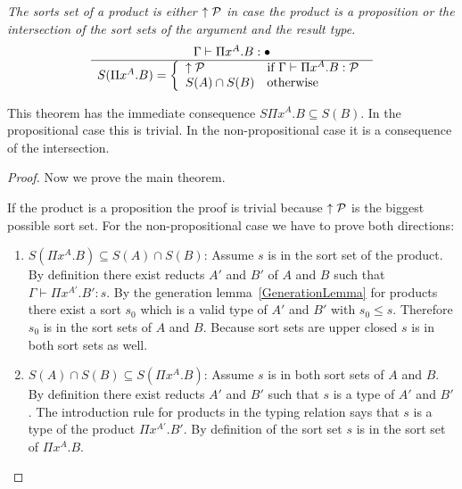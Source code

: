 \begin{theorem}
    \label{thm:SortSetProduct}
    \emph{The sorts set of a product is either ${\uparrow {\cal P}}$ in case the product
    is a proposition or the intersection of the sort sets of the argument and
    the result type.}
    $$
    \ruleh{
        \Gamma \vdash \Pi x^A. B : \dontcare
    }
    {
        S(\Pi x^A. B) =
        \dcases{
            \upper\Prop & \text{if }\Gamma \vdash \Pi x^A . B : \Prop
            \\
            S(A) \cap S(B) & \text{otherwise}
        }
    }
    $$

    This theorem has the immediate consequence $S\Pi x^A. B \subseteq S(B)$. In
    the propositional case this is trivial. In the non-propositional case it is
    a consequence of the intersection.

    \begin{proof}
        Now we prove the main theorem.

        If the product is a proposition the proof is trivial because
        ${\uparrow {\cal P}}$ is the biggest possible sort set. For the
        non-propositional case we have to prove both directions:
        \begin{enumerate}
            \item $S(\Pi x^A. B) \subseteq S(A) \cap S(B)$:
                Assume $s$ is in the sort set of the product. By definition
                there exist reducts $A'$ and $B'$ of $A$ and $B$ such that
                $\Gamma \vdash \Pi x^{A'}. B' : s$. By the generation
                lemma~\ref{GenerationLemma} for products there exist a sort
                $s_0$ which is a valid type of $A'$ and $B'$ with $s_0 \le s$.
                Therefore $s_0$ is in the sort sets of $A$ and $B$. Because sort
                sets are upper closed $s$ is in both sort sets as well.

            \item $S(A) \cap S(B) \subseteq S(\Pi x^A. B)$:
                Assume $s$ is in both sort sets of $A$ and $B$. By definition
                there exist reducts $A'$ and $B'$ such that $s$ is a type of
                $A'$ and $B'$. The introduction rule for products in the typing
                relation says that $s$ is a type of the product $\Pi x^{A'}.
                B'$. By definition of the sort set $s$ is in the sort set of
                $\Pi x^A. B$.
        \end{enumerate}
    \end{proof}
\end{theorem}






